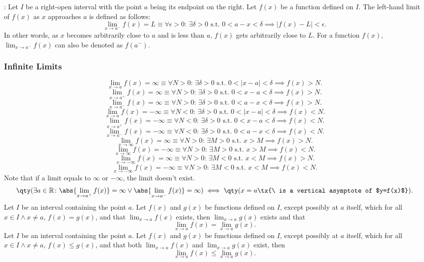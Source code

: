 \documentclass[a4paper,12pt]{report}
\begin{document}
: Let \(I\) be a right-open interval with the point \(a\) being its endpoint on the right. Let \( f(x) \) be a function defined on \(I\). The left-hand limit of \( f(x) \) as \( x \) approaches \( a \) is defined as follows:
\[\lim_{x \to a^-} f(x) = L \equiv \forall \epsilon > 0 :\,\exists \delta > 0 \text{\ s.t.\ } 0 < a - x < \delta \implies |f(x) - L| < \epsilon.\]
In other words, as \(x\) becomes arbitrarily close to \(a\) and is less than \(a\), \(f(x)\) gets arbitrarily close to \(L\). For a function $f(x)$, $\lim_{x\to a^-}f(x)$ can also be denoted as $f(a^-)$.
\subsubsection{Infinite Limits}
\[\lim_{x\to a}f(x)=\infty \equiv \forall N > 0:\, \exists \delta > 0 \text{\ s.t.\ } 0 < |x - a| < \delta \implies f(x) > N.\]
\[\lim_{x\to a^+}f(x)=\infty \equiv \forall N > 0:\, \exists \delta > 0 \text{\ s.t.\ } 0 < x - a < \delta \implies f(x) > N.\]
\[\lim_{x\to a^-}f(x)=\infty \equiv \forall N > 0:\, \exists \delta > 0 \text{\ s.t.\ } 0 < a - x < \delta \implies f(x) > N.\]
\[\lim_{x\to a}f(x)=-\infty \equiv \forall N < 0:\, \exists \delta > 0 \text{\ s.t.\ } 0 < |x - a| < \delta \implies f(x) < N.\]
\[\lim_{x\to a^+}f(x)=-\infty \equiv \forall N < 0:\, \exists \delta > 0 \text{\ s.t.\ } 0 < x - a < \delta \implies f(x) < N.\]
\[\lim_{x\to a^-}f(x)=-\infty \equiv \forall N < 0:\, \exists \delta > 0 \text{\ s.t.\ } 0 < a - x < \delta \implies f(x) < N.\]
\[\lim_{x\to\infty}f(x)=\infty \equiv \forall N > 0:\, \exists M > 0 \text{\ s.t.\ } x > M \implies f(x) > N.\]
\[\lim_{x\to\infty}f(x)=-\infty \equiv \forall N > 0:\, \exists M > 0 \text{\ s.t.\ } x > M \implies f(x) < N.\]
\[\lim_{x\to-\infty}f(x)=\infty \equiv \forall N > 0:\, \exists M < 0 \text{\ s.t.\ } x < M \implies f(x) > N.\]
\[\lim_{x\to-\infty}f(x)=-\infty \equiv \forall N > 0:\, \exists M < 0 \text{\ s.t.\ } x < M \implies f(x) < N.\]
Note that if a limit equals to $\infty$ or $-\infty$, the limit doesn't exist.
\[\qty(\exists a\in\mathbb{R}\colon\abs{\lim_{x \to a^+} f(x)}=\infty\lor\abs{\lim_{x \to a^-} f(x)}=\infty)\iff \qty(x=a\tx{\ is a vertical asymptote of $y=f(x)$}).\]
Let \(I\) be an interval containing the point \(a\). Let $f(x)$ and $g(x)$ be functions defined on \(I\), except possibly at \(a\) itself, which for all $x\in I\land x\neq a$, $f(x)=g(x)$, and that $\lim_{x\to a}f(x)$ exists, then $\lim_{x\to a}g(x)$ exists and that
\[\lim_{x\to a}f(x)=\lim_{x\to a}g(x).\]
Let \(I\) be an interval containing the point \(a\). Let $f(x)$ and $g(x)$ be functions defined on \(I\), except possibly at \(a\) itself, which for all $x\in I\land x\neq a$, $f(x)\leq g(x)$, and that both $\lim_{x\to a}f(x)$ and $\lim_{x\to a}g(x)$ exist, then
\[\lim_{x\to a}f(x)\leq\lim_{x\to a}g(x).\]
\end{document}
